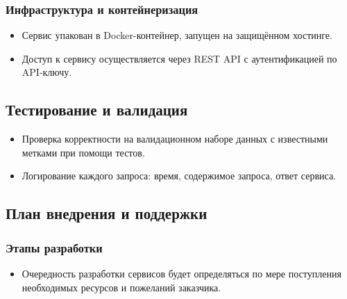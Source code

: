 \documentclass[12pt]{article}
\begin{document}
\subsubsection{Инфраструктура и контейнеризация}
\begin{itemize}
	\item Сервис упакован в Docker-контейнер, запущен на защищённом хостинге.
	\item Доступ к сервису осуществляется через REST API с аутентификацией по API-ключу.
\end{itemize}

\subsection{Тестирование и валидация}
\begin{itemize}
	\item Проверка корректности на валидационном наборе данных с известными метками при помощи тестов.
	\item Логирование каждого запроса: время, содержимое запроса, ответ сервиса.
\end{itemize}

\subsection{План внедрения и поддержки}

\subsubsection{Этапы разработки}
\begin{itemize}
	\item Очередность разработки сервисов будет определяться по мере поступления необходимых ресурсов и пожеланий заказчика.
\end{itemize}
\end{document}
